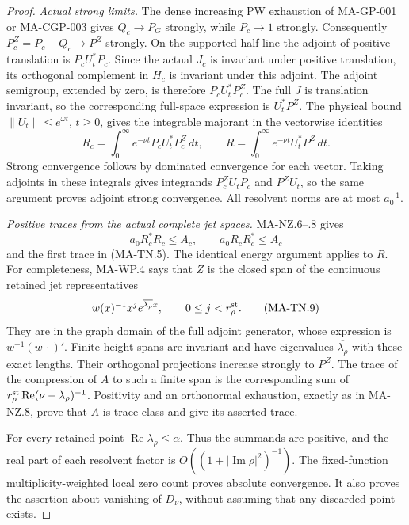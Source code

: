 \begin{proof}
\emph{Actual strong limits.}
The dense increasing PW exhaustion of MA-GP-001 or MA-CGP-003
gives \(Q_c\to P_G\) strongly, while \(P_c\to1\) strongly.
Consequently \(P_c^Z=P_c-Q_c\to P^Z\) strongly.  On the
supported half-line the adjoint of positive translation is
\(P_cU_t^*P_c\).  Since the actual \(J_c\) is invariant under
positive translation, its orthogonal complement in \(H_c\)
is invariant under this adjoint.  The adjoint semigroup,
extended by zero, is therefore \(P_cU_t^*P_c^Z\).
The full \(J\) is translation invariant, so the corresponding
full-space expression is \(U_t^*P^Z\).  The physical bound
\(\|U_t\|\le e^{\omega t}\), \(t\ge0\), gives the integrable
majorant in the vectorwise identities
\[
 R_c=\int_0^\infty e^{-\nu t}P_cU_t^*P_c^Z\,dt,\qquad
 R=\int_0^\infty e^{-\nu t}U_t^*P^Z\,dt .
 \tag{MA-TN.7}
\]
Strong convergence follows by dominated convergence for
each vector.  Taking adjoints in these integrals gives
integrands \(P_c^ZU_tP_c\) and \(P^ZU_t\), so the same
argument proves adjoint strong convergence.  All resolvent
norms are at most \(a_0^{-1}\).

\emph{Positive traces from the actual complete jet spaces.}
MA-NZ.6--.8 gives
\[
 a_0R_c^*R_c\le A_c,\qquad
 a_0R_cR_c^*\le A_c
 \tag{MA-TN.8}
\]
and the first trace in (MA-TN.5).  The identical energy
argument applies to \(R\).  For completeness, MA-WP.4 says
that \(Z\) is the closed span of the continuous retained
jet representatives
\[
       w(x)^{-1}x^j e^{\overline{\lambda_\rho}x},
                  \qquad 0\le j<r_\rho^{\rm st}.
 \tag{MA-TN.9}
\]
They are in the graph domain of the full adjoint generator,
whose expression is \(w^{-1}(w\,\cdot)'\).
Finite height spans are invariant and have eigenvalues
\(\overline{\lambda_\rho}\) with these exact lengths.
Their orthogonal projections increase strongly to \(P^Z\).
The trace of the compression of \(A\) to such a finite span
is the corresponding sum of
\(r_\rho^{\rm st}\operatorname{Re}(\nu-\lambda_\rho)^{-1}\).
Positivity and an orthonormal exhaustion, exactly as in
MA-NZ.8, prove that \(A\) is trace class and give its
asserted trace.

For every retained point \(\operatorname{Re}\lambda_\rho\le\alpha\).
Thus the summands are positive, and the real part of each
resolvent factor is \(O((1+|\operatorname{Im}\rho|^2)^{-1})\).
The fixed-function multiplicity-weighted local zero count
proves absolute convergence.  It also proves the assertion
about vanishing of \(D_\nu\), without assuming that any
discarded point exists.


\end{proof}
